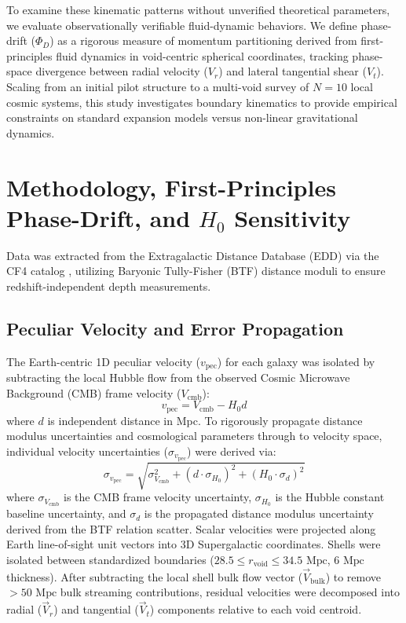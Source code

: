 \documentclass[trackchanges]{aastex631}
\begin{document}
To examine these kinematic patterns without unverified theoretical parameters, we evaluate observationally verifiable fluid-dynamic behaviors. We define phase-drift ($\Phi_D$) as a rigorous measure of momentum partitioning derived from first-principles fluid dynamics in void-centric spherical coordinates, tracking phase-space divergence between radial velocity ($V_r$) and lateral tangential shear ($V_t$). Scaling from an initial pilot structure to a multi-void survey of $N=10$ local cosmic systems, this study investigates boundary kinematics to provide empirical constraints on standard expansion models versus non-linear gravitational dynamics.

\section{Methodology, First-Principles Phase-Drift, and \texorpdfstring{$H_0$}{H\_0} Sensitivity}
Data was extracted from the Extragalactic Distance Database (EDD) via the CF4 catalog \citep{tully2023}, utilizing Baryonic Tully-Fisher (BTF) distance moduli to ensure redshift-independent depth measurements.

\subsection{Peculiar Velocity and Error Propagation}
The Earth-centric 1D peculiar velocity ($v_{\text{pec}}$) for each galaxy was isolated by subtracting the local Hubble flow from the observed Cosmic Microwave Background (CMB) frame velocity ($V_{\text{cmb}}$):
\begin{equation}
v_{\text{pec}} = V_{\text{cmb}} - H_0 d
\end{equation}
where $d$ is independent distance in Mpc. To rigorously propagate distance modulus uncertainties and cosmological parameters through to velocity space, individual velocity uncertainties ($\sigma_{v_{\text{pec}}}$) were derived via:
\begin{equation}
\sigma_{v_{\text{pec}}} = \sqrt{\sigma_{V_{\text{cmb}}}^2 + (d \cdot \sigma_{H_0})^2 + (H_0 \cdot \sigma_d)^2}
\end{equation}
where $\sigma_{V_{\text{cmb}}}$ is the CMB frame velocity uncertainty, $\sigma_{H_0}$ is the Hubble constant baseline uncertainty, and $\sigma_d$ is the propagated distance modulus uncertainty derived from the BTF relation scatter. Scalar velocities were projected along Earth line-of-sight unit vectors into 3D Supergalactic coordinates. Shells were isolated between standardized boundaries ($28.5 \le r_{\text{void}} \le 34.5\text{ Mpc}$, $6\text{ Mpc}$ thickness). After subtracting the local shell bulk flow vector ($\vec{V}_{\text{bulk}}$) to remove $>50\text{ Mpc}$ bulk streaming contributions, residual velocities were decomposed into radial ($\vec{V}_r$) and tangential ($\vec{V}_t$) components relative to each void centroid.
\end{document}
